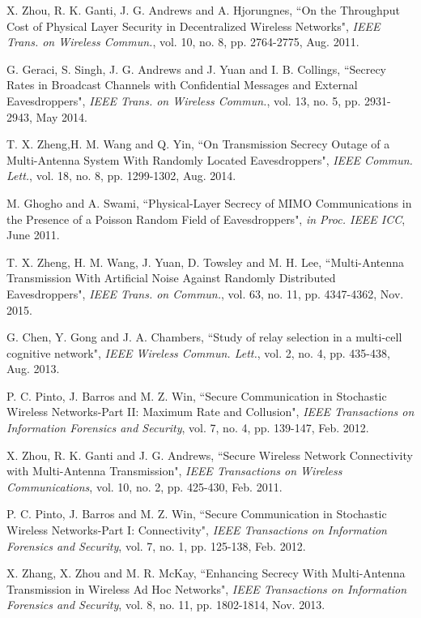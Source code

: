 \documentclass[10pt]{IEEEtran}
\begin{document}
\begin{thebibliography}{9}
X. Zhou, R. K. Ganti, J. G. Andrews and A. Hjorungnes, ``On the Throughput Cost of Physical Layer Security in Decentralized Wireless Networks", \textit{IEEE Trans. on Wireless Commun.}, vol. 10, no. 8, pp. 2764-2775, Aug. 2011.

G. Geraci, S. Singh, J. G. Andrews and J. Yuan and I. B. Collings, ``Secrecy Rates in Broadcast Channels with Confidential Messages and External Eavesdroppers", \textit{IEEE Trans. on Wireless Commun.}, vol. 13, no. 5, pp. 2931-2943, May 2014.

T. X. Zheng,H. M. Wang and Q. Yin, ``On Transmission Secrecy Outage of a Multi-Antenna System With Randomly Located Eavesdroppers", \textit{IEEE Commun. Lett.}, vol. 18, no. 8, pp. 1299-1302, Aug. 2014.

M. Ghogho and A. Swami, ``Physical-Layer Secrecy of \textsc{MIMO} Communications in the Presence of a Poisson Random Field of Eavesdroppers", \textit{in Proc. IEEE ICC}, June 2011.

T. X. Zheng, H. M. Wang, J. Yuan, D. Towsley and M. H. Lee, ``Multi-Antenna Transmission With Artificial Noise Against Randomly Distributed Eavesdroppers", \textit{IEEE Trans. on Commun.}, vol. 63, no. 11, pp. 4347-4362, Nov. 2015.


G. Chen, Y. Gong and J. A. Chambers, ``Study of relay selection in a multi-cell cognitive network", \textit{IEEE Wireless Commun. Lett.}, vol. 2, no. 4, pp. 435-438, Aug. 2013.


P. C. Pinto, J. Barros and M. Z. Win, ``Secure Communication in Stochastic Wireless Networks-Part \textsc{II}: Maximum Rate and Collusion", \textit{IEEE Transactions on Information Forensics and Security}, vol. 7, no. 4, pp. 139-147, Feb. 2012.


X. Zhou, R. K. Ganti and J. G. Andrews, ``Secure Wireless Network Connectivity with Multi-Antenna Transmission", \textit{IEEE Transactions on Wireless Communications}, vol. 10, no. 2, pp. 425-430, Feb. 2011.


P. C. Pinto, J. Barros and M. Z. Win, ``Secure Communication in Stochastic Wireless Networks-Part \textsc{I}: Connectivity", \textit{IEEE Transactions on Information Forensics and Security}, vol. 7, no. 1, pp. 125-138, Feb. 2012.

X. Zhang, X. Zhou and M. R. McKay, ``Enhancing Secrecy With Multi-Antenna Transmission in Wireless Ad Hoc Networks", \textit{IEEE Transactions on Information Forensics and Security}, vol. 8, no. 11, pp. 1802-1814, Nov. 2013.



\end{thebibliography}
\end{document}
